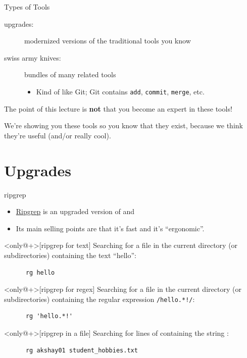 \begin{frame}{Types of Tools}
  \begin{description}
    \item[upgrades:] modernized versions of the traditional tools you know
      \pause
    \item[swiss army knives:] bundles of many related tools
      \pause
      \begin{itemize}
        \item Kind of like Git; Git contains \texttt{add}, \texttt{commit},
          \texttt{merge}, etc.
      \end{itemize}
    \pause
  \end{description}

  \vfill

  The point of this lecture is \textbf{not} that you become an expert in these
  tools!
  \pause

  We're showing you these tools so you know that they exist, because we think
  they're useful (and/or really cool).
\end{frame}

\section{Upgrades}

\begin{frame}[fragile]{ripgrep}
  \begin{itemize}
    \item \href{https://github.com/BurntSushi/ripgrep}{Ripgrep} is an upgraded
      version of  and 
    \item Its main selling points are that it's fast and it's
      \enquote{ergonomic}.
  \end{itemize}
  \pause
  \vfill
  \begin{example}<only@+>[ripgrep for text]
    Searching for a file in the current directory (or subdirectories) containing the text \enquote{hello}:
    \begin{verbatim}
      rg hello
    \end{verbatim}
  \end{example}
  \begin{example}<only@+>[ripgrep for regex]
    Searching for a file in the current directory (or subdirectories) containing the regular expression \texttt{/hello.*!/}:
    \begin{verbatim}
      rg 'hello.*!'
    \end{verbatim}
  \end{example}
  \begin{example}<only@+>[ripgrep in a file]
    Searching for lines of  containing the string :
    \begin{verbatim}
      rg akshay01 student_hobbies.txt
    \end{verbatim}
  \end{example}
\end{frame}

